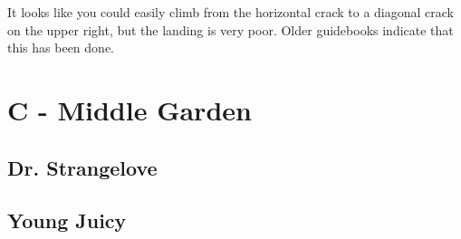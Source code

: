 \begin{multicols}{2}
\begin{adjustwidth}{0.5cm}{}			
It looks like you could easily climb from the horizontal crack to a diagonal crack on the upper right, but the landing is very poor. Older guidebooks indicate that this has been done.
\end{adjustwidth}




\newpage

\section{C - Middle Garden}\label{sa:Middle Garden}




\needspace{1.5cm}
\subsection*{Dr. Strangelove}\label{bf:Dr. Strangelove}
	



\needspace{1.5cm}
\subsection*{Young Juicy}\label{bf:Young Juicy}
	




\end{multicols}
\clearpage